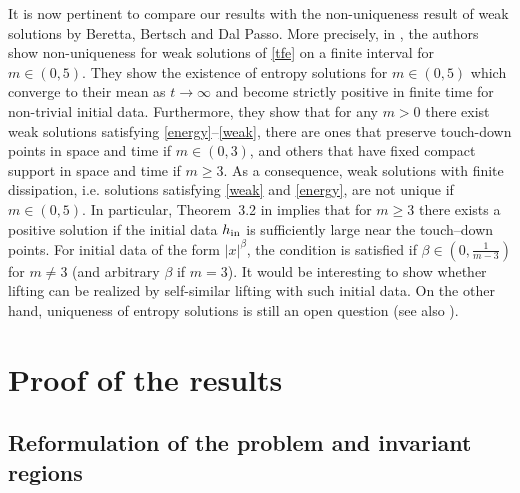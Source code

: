 \documentclass{article}%
\begin{document}
It is now pertinent to compare our results with the non-uniqueness result of weak solutions 
by Beretta, Bertsch and Dal Passo. More precisely, in \cite{BerettaBertschDalpasso-1995}, 
the authors show non-uniqueness for weak solutions of \eqref{tfe} on a finite 
interval for $m \in (0,5)$. They show the existence of entropy solutions for 
$m \in (0,5)$ which converge to their mean as $t\to\infty$ and become strictly positive in finite time 
for non-trivial initial data. Furthermore, they show that for any $m>0$ there exist weak solutions satisfying 
\eqref{energy}--\eqref{weak}, there are ones that preserve touch-down points in space and time if 
$m \in (0,3)$, and others that have fixed compact support in space and time if $m\geq3$.
 As a consequence, weak solutions with finite dissipation, i.e. solutions satisfying 
\eqref{weak} and \eqref{energy}, are not unique if $m \in (0,5)$. In particular, Theorem~3.2 in
 \cite{BerettaBertschDalpasso-1995} implies that for $m\geq 3$ there exists a
 positive solution if the initial data $h_{\rm in}$ is sufficiently large near
 the touch--down points. For initial data of the form $|x|^{\beta}$, the
 condition is satisfied if $\beta \in (0,\frac 1{m-3})$ for $m \neq 3$ (and
 arbitrary $\beta$ if $m = 3$). It would be interesting to show whether lifting
 can be realized by self-similar lifting with such initial data.  On the other
 hand, uniqueness of entropy solutions is still an open question (see also
 \cite[Theorem~5.1 and 5.2]{BertschGiacomelliKarali-2005}).


\section{Proof of the results} \label{sec-lifting}


\subsection{Reformulation of the problem and invariant regions}
\end{document}
